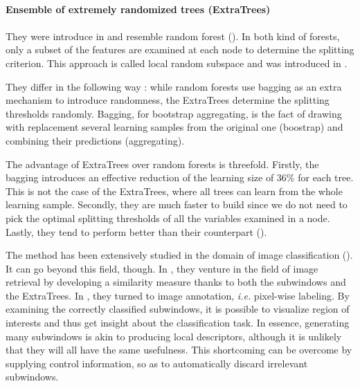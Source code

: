 \documentclass[a4paper]{report}
\begin{document}
\begin{leftbar}
	\paragraph{Ensemble of extremely randomized trees (ExtraTrees)}
	\paragraph{}
	They were introduce in \cite{extratrees} and resemble random forest (\cite{randomforests}). In both kind of forests, only a subset of the features are examined at each node to determine the splitting criterion. This approach is called local random subspace and was introduced in \cite{randomsubspace}. 
	\par
	They differ in the following way : while random forests use bagging as an extra mechanism to introduce randomness, the ExtraTrees determine the splitting thresholds randomly. Bagging, for bootstrap aggregating, is the fact of drawing with replacement several learning samples from the original one (boostrap) and combining their predictions (aggregating). 
	\par
	The advantage of ExtraTrees over random forests is threefold. Firstly, the bagging introduces an effective reduction of the learning size of 36\% for each tree. This is not the case of the ExtraTrees, where all trees can learn from the whole learning sample. Secondly, they are much faster to build since we do not need to pick the optimal splitting thresholds of all the variables examined in a node. Lastly, they tend to perform better than their counterpart (\cite{extratrees}).
\end{leftbar}
The method has been extensively studied in the domain of image classification (\cite{base}). It can go beyond this field, though. In \cite{PixitImgRetrieval}, they venture in the field of image retrieval by developing a similarity measure thanks to both the subwindows and the ExtraTrees. In \cite{PixitLabeling}, they turned to image annotation, \textit{i.e.} pixel-wise labeling. By examining the correctly classified subwindows, it is possible to visualize region of interests and thus get insight about the classification task. In essence, generating many subwindows is akin to producing local descriptors, although it is unlikely that they will all have the same usefulness. This shortcoming can be overcome by supplying control information, so as to automatically discard irrelevant subwindows.
\end{document}
